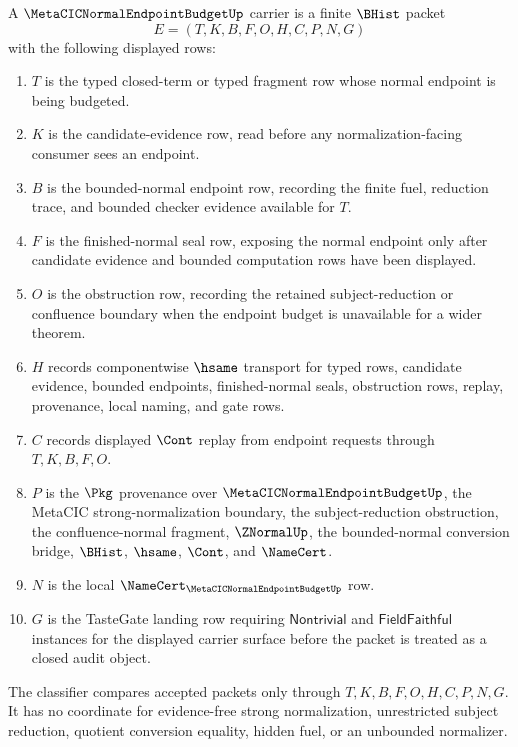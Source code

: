 \begin{definition}
\label{def:metacic-normal-endpoint-budget-carrier}
A $\MetaCICNormalEndpointBudgetUp$ carrier is a finite $\BHist$ packet
$$
E=(T,K,B,F,O,H,C,P,N,G)
$$
with the following displayed rows:
\begin{enumerate}
\item $T$ is the typed closed-term or typed fragment row whose normal endpoint is being budgeted.
\item $K$ is the candidate-evidence row, read before any normalization-facing consumer sees an endpoint.
\item $B$ is the bounded-normal endpoint row, recording the finite fuel, reduction trace, and bounded checker evidence available for $T$.
\item $F$ is the finished-normal seal row, exposing the normal endpoint only after candidate evidence and bounded computation rows have been displayed.
\item $O$ is the obstruction row, recording the retained subject-reduction or confluence boundary when the endpoint budget is unavailable for a wider theorem.
\item $H$ records componentwise $\hsame$ transport for typed rows, candidate evidence, bounded endpoints, finished-normal seals, obstruction rows, replay, provenance, local naming, and gate rows.
\item $C$ records displayed $\Cont$ replay from endpoint requests through $T,K,B,F,O$.
\item $P$ is the $\Pkg$ provenance over $\MetaCICNormalEndpointBudgetUp$, the MetaCIC strong-normalization boundary, the subject-reduction obstruction, the confluence-normal fragment, $\ZNormalUp$, the bounded-normal conversion bridge, $\BHist$, $\hsame$, $\Cont$, and $\NameCert$.
\item $N$ is the local $\NameCert_{\MetaCICNormalEndpointBudgetUp}$ row.
\item $G$ is the TasteGate landing row requiring $\mathsf{Nontrivial}$ and $\mathsf{FieldFaithful}$ instances for the displayed carrier surface before the packet is treated as a closed audit object.
\end{enumerate}
The classifier compares accepted packets only through $T,K,B,F,O,H,C,P,N,G$. It has no coordinate for evidence-free strong normalization, unrestricted subject reduction, quotient conversion equality, hidden fuel, or an unbounded normalizer.
\end{definition}

